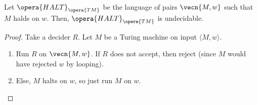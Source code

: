 \begin{thm}
	Let $\opera{HALT}_{\opera{TM}}$ be the language of pairs $\vecn{M,w}$ such that $M$ halds on $w$.
	Then, $\opera{HALT}_{\opera{TM}}$ is undecidable.
\end{thm}

\begin{proof}
	Take a decider $R$. Let $M$ be a Turing machine on input $\langle M, w\rangle$.
	\begin{enumerate}
		\item Run $R$ on $\vecn{M,w}$. If $R$ does not accept, then reject (since $M$ would have rejected $w$ by looping).
		\item Else, $M$ halts on $w$, so just run $M$ on $w$.
	\end{enumerate}
\end{proof}


